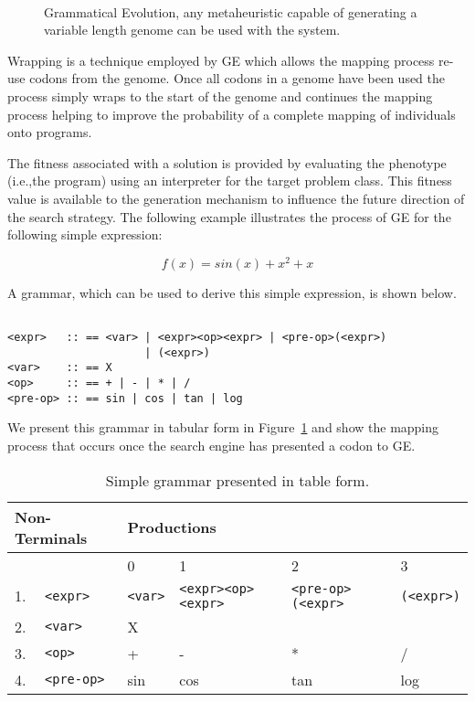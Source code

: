 \begin{figure}[tbp]
\centerline{\hbox{
}}
\caption[Grammatical Evolution model.]{Grammatical Evolution, any metaheuristic capable of generating a variable length genome can be used with the system.}
\label{ge_fig1}
\end{figure}

Wrapping\label{sec:wrapping} is a technique employed by GE which allows the mapping process re-use codons from the genome. Once all codons in a genome have been used the process simply wraps to the start of the genome and continues the mapping process helping to improve the probability of a complete mapping of individuals onto programs.
 
The fitness associated with a solution is provided by evaluating the phenotype (i.e.,the program) using an interpreter for the target problem class. This fitness value is available to the generation mechanism to influence the future direction of the search strategy.
The following example illustrates the process of GE for the following simple expression: 


\begin{displaymath}
f(x) = sin(x) + x^2 + x
\end{displaymath}

A grammar, which can be used to derive this simple expression, is shown below.

\small
\label{sect:simple_grammar_bnf}\begin{verbatim}

<expr>   :: == <var> | <expr><op><expr> | <pre-op>(<expr>)
                     | (<expr>) 
<var>    :: == X  	                                           
<op>     :: == + | - | * | /                            
<pre-op> :: == sin | cos | tan | log        

\end{verbatim}
\normalsize

We present this grammar in tabular form in Figure~\ref{simple_grammar_table} and show the mapping process that occurs once the search engine has presented a codon to GE.

\begin{table}[h]
\begin{center}
\begin{tabular}{|l|l|l|l|l|l|}
\hline
\multicolumn{2}{|l|}{Non-Terminals}
&\multicolumn{4}{|l|}{Productions} \\
\hline
\multicolumn{2}{|l|}{ }
& 0 & 1 & 2 & 3 \\
\hline
1. & \verb|<expr>| & \verb|<var>| & \verb|<expr><op><expr>| & \verb|<pre-op>(<expr>| & \verb|(<expr>)| \\
2. & \verb|<var>| & X & & & \\
3. & \verb|<op>| & + & - & * & / \\
4. & \verb|<pre-op>| & sin & cos & tan & log \\
\hline
\end{tabular}
\caption{\label{simple_grammar_table}Simple grammar presented in table form.}
\end{center}
\end{table}



